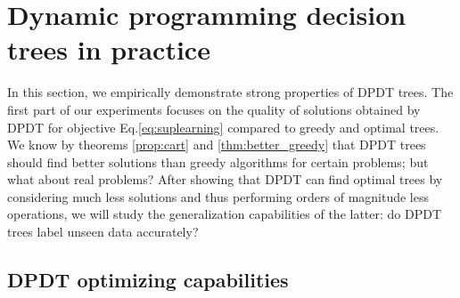 \chapter{Dynamic programming decision trees in practice}\label{sec:exps-dt}

In this section, we empirically demonstrate strong properties of DPDT trees. 
The first part of our experiments focuses on the quality of solutions obtained by DPDT for objective Eq.\ref{eq:suplearning} compared to greedy and optimal trees. We know by theorems \ref{prop:cart} and \ref{thm:better_greedy} that DPDT trees should find better solutions than greedy algorithms for certain problems; but what about real problems?
After showing that DPDT can find optimal trees by considering much less solutions and thus performing orders of magnitude less operations, we will study the generalization capabilities of the latter: do DPDT trees label unseen data accurately?

\section{DPDT optimizing capabilities}


